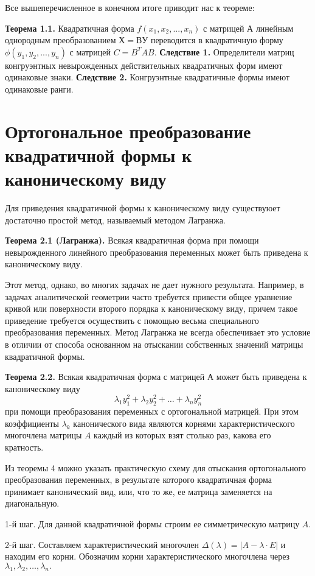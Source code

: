 \documentclass[bachelor, och, coursework, times]{SCWorks}
\newcommand\tab[1][1cm]{\hspace*{#1}}
\newcommand{\tl}{\newline\tab}
\begin{document}
Все вышеперечисленное в конечном итоге приводит нас к теореме:

\textbf{Теорема 1.1.} Квадратичная форма $f(x_1, x_2,...,x_n)$ с матрицей $А$ линейным однородным преобразованием $Х = ВУ$ переводится в квадратичную форму $\phi(y_1, y_2,...,y_n)$ с матрицей $C=B^{T}AB$.
\tl
\textbf{Следствие 1.} Определители матриц конгруэнтных невырожденных действительных квадратичных форм имеют одинаковые знаки.
\tl
\textbf{Следствие 2.} Конгруэнтные квадратичные формы имеют одинаковые ранги.

\section{Ортогональное преобразование квадратичной формы к каноническому виду}

Для приведения квадратичной формы к каноническому виду существуюет достаточно простой метод, называемый методом Лагранжа.

\textbf{Теорема 2.1 (Лагранжа).} Всякая квадратичная форма при помощи невырожденного линейного преобразования переменных может быть приведена к каноническому виду. 


Этот метод, однако, во многих задачах не дает нужного результата. Например, в задачах аналитической геометрии часто требуется привести общее уравнение кривой или поверхности второго порядка к каноническому виду, причем такое приведение требуется осуществить с помощью весьма специального преобразования переменных. Метод Лагранжа не всегда обеспечивает это условие в отличии от способа основанном на отыскании собственных значений матрицы квадратичной формы. 


\textbf{Теорема 2.2.} Всякая квадратичная форма с матрицей $А$ может быть приведена к каноническому виду 
$$ \lambda_1y_1^2+\lambda_2y_2^2+\dots + \lambda_ny_n^2$$
при помощи преобразования переменных с ортогональной матрицей. При этом коэффициенты $ \lambda_k $ канонического вида являются корнями характеристического многочлена матрицы $A$ каждый из которых взят столько раз, какова его кратность. 

Из теоремы 4 можно указать практическую схему для отыскания ортогонального преобразования переменных, в результате которого квадратичная форма принимает канонический вид, или, что то же, ее матрица заменяется на диагональную. 

1-й шаг. Для данной квадратичной формы строим ее симметрическую матрицу $A$.

2-й шаг. Составляем характеристический многочлен $\Delta(\lambda) = |A - \lambda\cdot E|$ и находим его корни. Обозначим корни характеристического многочлена через $\lambda_1, \lambda_2, \dots, \lambda_n.$
\end{document}
